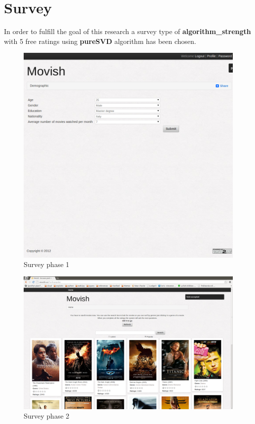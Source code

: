 \section{Survey}
\label{sec:research_survey}

In order to fulfill the goal of this research a survey type of \textbf{algorithm\_strength} with 5 free ratings using \textbf{pureSVD} algorithm has been chosen.

\begin{figure}
  \centering
  \includegraphics[width=\textwidth]{figures/survey_demographic.png}
  \caption{Survey phase 1}
  \label{fig:survey_phase_1}
\end{figure}

\begin{figure}
  \centering
  \includegraphics[width=\textwidth]{figures/free_ratings.png}
  \caption{Survey phase 2}
  \label{fig:survey_phase_2}
\end{figure}

